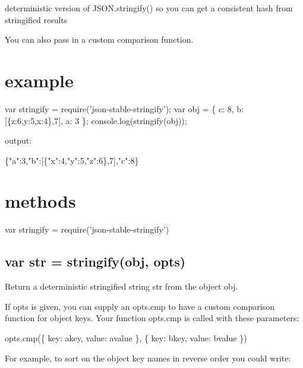 deterministic version of {\ttfamily J\+S\+O\+N.\+stringify()} so you can get a consistent hash from stringified results

You can also pass in a custom comparison function.

\href{https://ci.testling.com/substack/json-stable-stringify}{\tt }

\href{http://travis-ci.org/substack/json-stable-stringify}{\tt }

\section*{example}


\begin{DoxyCode}
var stringify = require('json-stable-stringify');
var obj = \{ c: 8, b: [\{z:6,y:5,x:4\},7], a: 3 \};
console.log(stringify(obj));
\end{DoxyCode}


output\+:


\begin{DoxyCode}
\{"a":3,"b":[\{"x":4,"y":5,"z":6\},7],"c":8\}
\end{DoxyCode}


\section*{methods}


\begin{DoxyCode}
var stringify = require('json-stable-stringify')
\end{DoxyCode}


\subsection*{var str = stringify(obj, opts)}

Return a deterministic stringified string {\ttfamily str} from the object {\ttfamily obj}.

If {\ttfamily opts} is given, you can supply an {\ttfamily opts.\+cmp} to have a custom comparison function for object keys. Your function {\ttfamily opts.\+cmp} is called with these parameters\+:


\begin{DoxyCode}
opts.cmp(\{ key: akey, value: avalue \}, \{ key: bkey, value: bvalue \})
\end{DoxyCode}


For example, to sort on the object key names in reverse order you could write\+:


